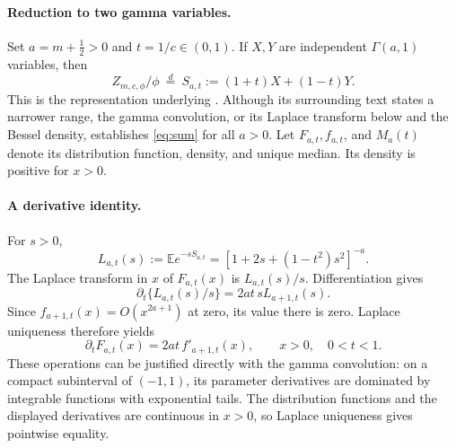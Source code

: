 \documentclass[11pt]{article}
\newcommand{\E}{\mathbb E}
\begin{document}
\paragraph{Reduction to two gamma variables.}
Set \(a=m+\tfrac12>0\) and \(t=1/c\in(0,1)\). If \(X,Y\) are independent
\(\Gamma(a,1)\) variables, then
\begin{equation}\label{eq:sum}
 Z_{m,c,\phi}/\phi\ \stackrel{d}{=}\ 
 S_{a,t}:=(1+t)X+(1-t)Y .
\end{equation}
This is the representation underlying \cite[eq.\ (3.44)]{GM}.
Although its surrounding text states a narrower range, the gamma
convolution, or its Laplace transform below and the Bessel density,
establishes \eqref{eq:sum} for all \(a>0\).
Let \(F_{a,t},f_{a,t}\), and \(M_a(t)\) denote its distribution function,
density, and unique median. Its density is positive for \(x>0\).

\paragraph{A derivative identity.}
For \(s>0\),
\[
 L_{a,t}(s):=\E e^{-sS_{a,t}}
       =[1+2s+(1-t^2)s^2]^{-a}.
\]
The Laplace transform in \(x\) of \(F_{a,t}(x)\) is \(L_{a,t}(s)/s\).
Differentiation gives
\[
 \partial_t\{L_{a,t}(s)/s\}=2at\,sL_{a+1,t}(s).
\]
Since \(f_{a+1,t}(x)=O(x^{2a+1})\) at zero, its value there is zero.
Laplace uniqueness therefore yields
\begin{equation}\label{eq:identity}
 \partial_t F_{a,t}(x)=2at\,f'_{a+1,t}(x),\qquad x>0,\quad 0<t<1.
\end{equation}
These operations can be justified directly with the gamma convolution:
on a compact subinterval of \((-1,1)\), its parameter derivatives
are dominated by integrable functions with exponential tails.
The distribution functions and the displayed derivatives are
continuous in \(x>0\), so Laplace uniqueness gives pointwise equality.
\end{document}
